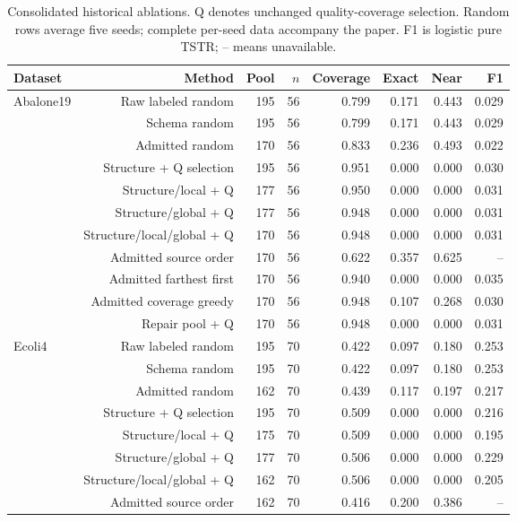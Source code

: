 \begin{table}[!t]
\centering
\caption{Consolidated historical ablations. Q denotes unchanged quality-coverage selection. Random rows average five seeds; complete per-seed data accompany the paper. F1 is logistic pure TSTR; -- means unavailable.}\label{tab:ablations}
\footnotesize\setlength{\tabcolsep}{6pt}
\begin{tabular}{lrrrrrrr}
\toprule
Dataset & Method & Pool & $n$ & Coverage & Exact & Near & F1 \\
\midrule
Abalone19 & Raw labeled random & 195 & 56 & 0.799 & 0.171 & 0.443 & 0.029 \\
 & Schema random & 195 & 56 & 0.799 & 0.171 & 0.443 & 0.029 \\
 & Admitted random & 170 & 56 & 0.833 & 0.236 & 0.493 & 0.022 \\
 & Structure + Q selection & 195 & 56 & 0.951 & 0.000 & 0.000 & 0.030 \\
 & Structure/local + Q & 177 & 56 & 0.950 & 0.000 & 0.000 & 0.031 \\
 & Structure/global + Q & 177 & 56 & 0.948 & 0.000 & 0.000 & 0.031 \\
 & Structure/local/global + Q & 170 & 56 & 0.948 & 0.000 & 0.000 & 0.031 \\
 & Admitted source order & 170 & 56 & 0.622 & 0.357 & 0.625 & -- \\
 & Admitted farthest first & 170 & 56 & 0.940 & 0.000 & 0.000 & 0.035 \\
 & Admitted coverage greedy & 170 & 56 & 0.948 & 0.107 & 0.268 & 0.030 \\
 & Repair pool + Q & 170 & 56 & 0.948 & 0.000 & 0.000 & 0.031 \\
Ecoli4 & Raw labeled random & 195 & 70 & 0.422 & 0.097 & 0.180 & 0.253 \\
 & Schema random & 195 & 70 & 0.422 & 0.097 & 0.180 & 0.253 \\
 & Admitted random & 162 & 70 & 0.439 & 0.117 & 0.197 & 0.217 \\
 & Structure + Q selection & 195 & 70 & 0.509 & 0.000 & 0.000 & 0.216 \\
 & Structure/local + Q & 175 & 70 & 0.509 & 0.000 & 0.000 & 0.195 \\
 & Structure/global + Q & 177 & 70 & 0.506 & 0.000 & 0.000 & 0.229 \\
 & Structure/local/global + Q & 162 & 70 & 0.506 & 0.000 & 0.000 & 0.205 \\
 & Admitted source order & 162 & 70 & 0.416 & 0.200 & 0.386 & -- \\

\end{tabular}
\end{table}
